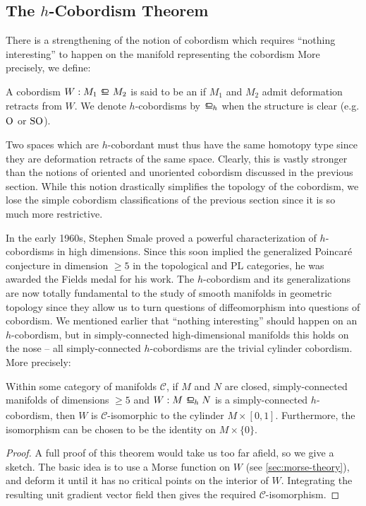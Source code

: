 \begin{remark}
\subsection{The $h$-Cobordism Theorem}

There is a strengthening of the notion of cobordism which requires ``nothing interesting'' to happen on the manifold representing the cobordism
More precisely, we define:
\begin{definition}
	A cobordism $W : M_1\bord M_2$ is said to be an  if $M_1$ and $M_2$ admit deformation retracts from $W$. We denote $h$-cobordisms by $\hbord$ when the structure is clear (e.g. $\mathrm{O}$ or $\mathrm{SO}$).
\end{definition}

Two spaces which are $h$-cobordant must thus have the same homotopy type since they are deformation retracts of the same space. Clearly, this is vastly stronger than the notions of oriented and unoriented cobordism discussed in the previous section. While this notion drastically simplifies the topology of the cobordism, we lose the simple cobordism classifications of the previous section since it is so much more restrictive. 

In the early 1960s, Stephen Smale proved \cite{smale1961generalized} a powerful characterization of $h$-cobordisms in high dimensions. Since this soon implied the generalized Poincar\'e conjecture in dimension $\geq 5$ in the topological and PL categories, he was awarded the Fields medal for his work. 
The $h$-cobordism and its generalizations are now totally fundamental to the study of smooth manifolds in geometric topology since they allow us to turn questions of diffeomorphism into questions of cobordism.
We mentioned earlier that ``nothing interesting'' should happen on an $h$-cobordism, but in simply-connected high-dimensional manifolds this holds on the nose -- all simply-connected $h$-cobordisms are the trivial cylinder cobordism. More precisely:

\begin{theorem}[$h$-cobordism]\label{thm:h-cobordism}
	Within some category of manifolds $\mathscr{C}$, if $M$ and $N$ are closed, simply-connected manifolds of dimensions $\geq 5$ and $W : M \hbord N$ is a simply-connected $h$-cobordism, then $W$ is $\mathscr{C}$-isomorphic to the cylinder $M\times [0,1]$. Furthermore, the isomorphism can be chosen to be the identity on $M\times \{0\}$.
\end{theorem}
\begin{proof}
	A full proof of this theorem would take us too far afield, so we give a sketch. The basic idea is to use a Morse function on $W$ (see \cref{sec:morse-theory}), and deform it until it has no critical points on the interior of $W$. Integrating the resulting unit gradient vector field then gives the required $\mathscr{C}$-isomorphism.


\end{proof}
\end{remark}
